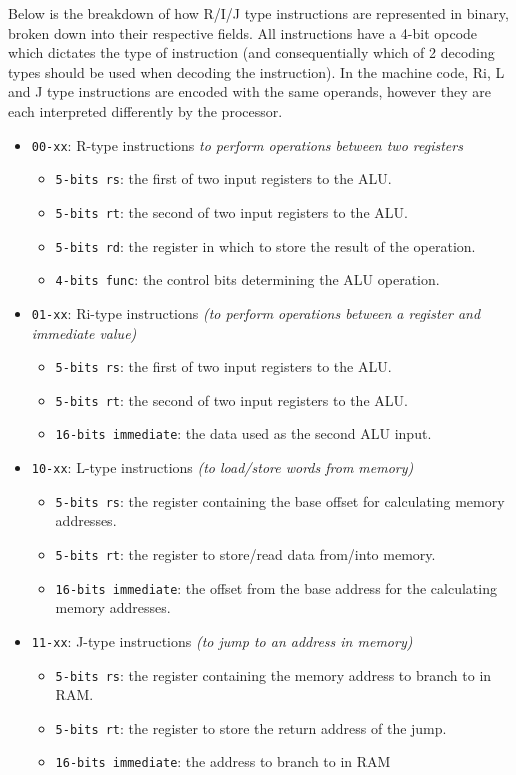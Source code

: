 \label{sec:MachineCodeEncoding}
Below is the breakdown of how R/I/J type instructions are represented in binary, broken down into their respective fields. All instructions have a 4-bit opcode which dictates the type of instruction (and consequentially which of 2 decoding types should be used when decoding the instruction). In the machine code, Ri, L and J type instructions are encoded with the same operands, however they are each interpreted differently by the processor. 

\begin{itemize}
  \item \texttt{00-xx}: R-type instructions \textit{to perform operations between two registers}
    \begin{itemize}
      \item \texttt{5-bits rs}: the first of two input registers to the ALU.
      \item \texttt{5-bits rt}: the second of two input registers to the ALU.
      \item \texttt{5-bits rd}: the register in  which to store the result of the operation.
      \item \texttt{4-bits func}: the control bits determining the ALU operation.
    \end{itemize}
  \item \texttt{01-xx}: Ri-type instructions \textit{(to perform operations between a register and immediate value)}
    \begin{itemize}
      \item \texttt{5-bits rs}: the first of two input registers to the ALU.
      \item \texttt{5-bits rt}: the second of two input registers to the ALU.
      \item \texttt{16-bits immediate}: the data used as the second ALU input.
    \end{itemize}
  \item \texttt{10-xx}: L-type instructions \textit{(to load/store words from memory)}
    \begin{itemize}
      \item \texttt{5-bits rs}: the register containing the base offset for calculating memory addresses.
      \item \texttt{5-bits rt}: the register to store/read data from/into memory.
      \item \texttt{16-bits immediate}: the offset from the base address for the calculating memory addresses.
    \end{itemize}
  \item \texttt{11-xx}: J-type instructions \textit{(to jump to an address in memory)}
    \begin{itemize}
      \item \texttt{5-bits rs}: the register containing the memory address to branch to in RAM.
      \item \texttt{5-bits rt}: the register to store the return address of the jump.
      \item \texttt{16-bits immediate}: the address to branch to in RAM
    \end{itemize}
\end{itemize}
 
